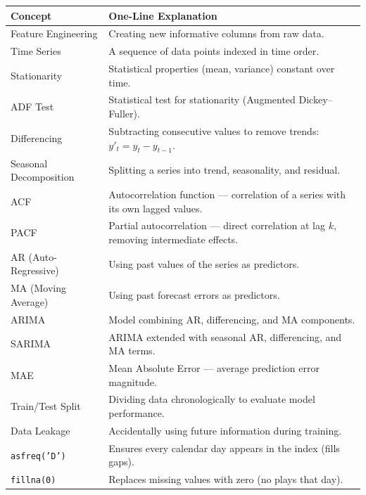 \documentclass[12pt, a4paper]{article}
\begin{document}
\begin{center}
\small
\begin{tabular}{p{4cm}p{10cm}}
    \toprule
    \textbf{Concept} & \textbf{One-Line Explanation} \\
    \midrule
    Feature Engineering    & Creating new informative columns from raw data. \\
    Time Series            & A sequence of data points indexed in time order. \\
    Stationarity           & Statistical properties (mean, variance) constant over time. \\
    ADF Test               & Statistical test for stationarity (Augmented Dickey--Fuller). \\
    Differencing           & Subtracting consecutive values to remove trends: $y'_t = y_t - y_{t-1}$. \\
    Seasonal Decomposition & Splitting a series into trend, seasonality, and residual. \\
    ACF                    & Autocorrelation function --- correlation of a series with its own lagged values. \\
    PACF                   & Partial autocorrelation --- direct correlation at lag $k$, removing intermediate effects. \\
    AR (Auto-Regressive)   & Using past values of the series as predictors. \\
    MA (Moving Average)    & Using past forecast errors as predictors. \\
    ARIMA                  & Model combining AR, differencing, and MA components. \\
    SARIMA                 & ARIMA extended with seasonal AR, differencing, and MA terms. \\
    MAE                    & Mean Absolute Error --- average prediction error magnitude. \\
    Train/Test Split       & Dividing data chronologically to evaluate model performance. \\
    Data Leakage           & Accidentally using future information during training. \\
    \texttt{asfreq('D')}   & Ensures every calendar day appears in the index (fills gaps). \\
    \texttt{fillna(0)}     & Replaces missing values with zero (no plays that day). \\
    \bottomrule
\end{tabular}
\end{center}
\end{document}
